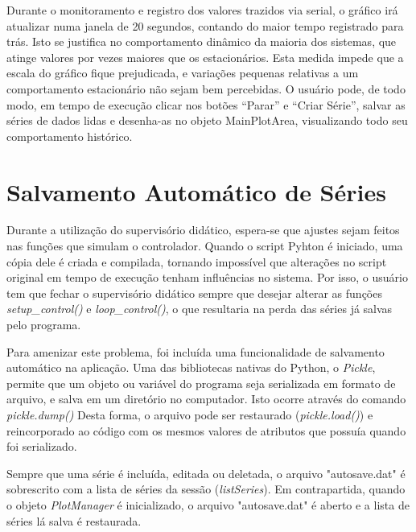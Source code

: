 Durante o monitoramento e registro dos valores trazidos via serial, o gráfico irá atualizar numa janela de 20 segundos, contando do maior tempo registrado para trás. Isto se justifica no comportamento dinâmico da maioria dos sistemas, que atinge valores por vezes maiores que os estacionários. Esta medida impede que a escala do gráfico fique prejudicada, e variações pequenas relativas a um comportamento estacionário não sejam bem percebidas. O usuário pode, de todo modo, em tempo de execução clicar nos botões “Parar” e “Criar Série”, salvar as séries de dados lidas e desenha-as no objeto MainPlotArea, visualizando todo seu comportamento histórico.

\section{Salvamento Automático de Séries}

Durante a utilização do supervisório didático, espera-se que ajustes sejam feitos nas funções que simulam o controlador. Quando o script Pyhton é iniciado, uma cópia dele é criada e compilada, tornando impossível que alterações no script original em tempo de execução tenham influências no sistema. Por isso, o usuário tem que fechar o supervisório didático sempre que desejar alterar as funções \emph{setup\_control()} e \emph{loop\_control()}, o que resultaria na perda das séries já salvas pelo programa.

Para amenizar este problema, foi incluída uma funcionalidade de salvamento automático na aplicação. Uma das bibliotecas nativas do Python, o \emph{Pickle}, permite que um objeto ou variável do programa seja serializada em formato de arquivo, e salva em um diretório no computador. Isto ocorre através do comando \emph{pickle.dump()} Desta forma, o arquivo pode ser restaurado (\emph{pickle.load()}) e reincorporado ao código com os mesmos valores de atributos que possuía quando foi serializado.

Sempre que uma série é incluída, editada ou deletada, o arquivo "autosave.dat" é sobrescrito com a lista de séries da sessão (\emph{listSeries}). Em contrapartida, quando o objeto \emph{PlotManager} é inicializado, o arquivo "autosave.dat" é aberto e a lista de séries lá salva é restaurada.